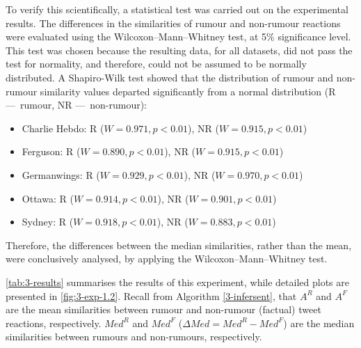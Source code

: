 To verify this scientifically, a statistical test was carried out on the experimental results. The differences in the similarities of rumour and non-rumour reactions were evaluated using the Wilcoxon–Mann–Whitney test, at 5\% significance level. This test was chosen because the resulting data, for all datasets, did not pass the test for normality, and therefore, could not be assumed to be normally distributed. A Shapiro-Wilk test showed that the distribution of rumour and non-rumour similarity values departed significantly from a normal distribution (R — rumour, NR — non-rumour):
\begin{itemize}
  \item Charlie Hebdo: R ($W = 0.971, p < 0.01$), NR ($W = 0.915, p < 0.01$)
  \item Ferguson: R ($W = 0.890, p < 0.01$), NR ($W = 0.915, p < 0.01$)
  \item Germanwings: R ($W = 0.929, p < 0.01$), NR ($W = 0.970, p < 0.01$)
  \item Ottawa: R ($W = 0.914, p < 0.01$), NR ($W = 0.901, p < 0.01$)
  \item Sydney: R ($W = 0.918, p < 0.01$), NR ($W = 0.883, p < 0.01$)
\end{itemize}

Therefore, the differences between the median similarities, rather than the mean, were conclusively analysed, by applying the Wilcoxon–Mann–Whitney test.

\autoref{tab:3-results} summarises the results of this experiment, while detailed plots are presented in \autoref{fig:3-exp-1.2}. Recall from Algorithm \autoref{3-infersent}, that $A^R$ and $A^F$ are the mean similarities between rumour and non-rumour (factual) tweet reactions, respectively. $Med^R$ and $Med^F$ ($\Delta Med = Med^R - Med^F$) are the median similarities between rumours and non-rumours, respectively.

